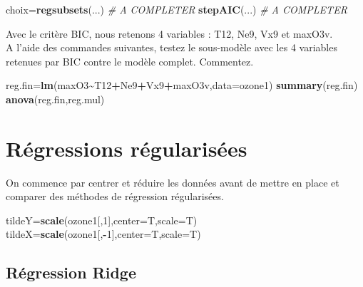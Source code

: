 \documentclass[
]{article}
\newenvironment{Shaded}{\begin{snugshade}}{\end{snugshade}}
\newcommand{\AttributeTok}[1]{\textcolor[rgb]{0.13,0.29,0.53}{#1}}
\newcommand{\CommentTok}[1]{\textcolor[rgb]{0.56,0.35,0.01}{\textit{#1}}}
\newcommand{\DecValTok}[1]{\textcolor[rgb]{0.00,0.00,0.81}{#1}}
\newcommand{\FunctionTok}[1]{\textcolor[rgb]{0.13,0.29,0.53}{\textbf{#1}}}
\newcommand{\NormalTok}[1]{#1}
\newcommand{\OtherTok}[1]{\textcolor[rgb]{0.56,0.35,0.01}{#1}}
\newcommand{\SpecialCharTok}[1]{\textcolor[rgb]{0.81,0.36,0.00}{\textbf{#1}}}
\begin{document}
\begin{Shaded}
\begin{Highlighting}[]
\NormalTok{choix}\OtherTok{=}\FunctionTok{regsubsets}\NormalTok{(...) }\CommentTok{\# A COMPLETER}
\FunctionTok{stepAIC}\NormalTok{(...)}
\CommentTok{\# A COMPLETER}
\end{Highlighting}
\end{Shaded}

Avec le critère BIC, nous retenons 4 variables : T12, Ne9, Vx9 et
maxO3v.\\
A l'aide des commandes suivantes, testez le sous-modèle avec les 4
variables retenues par BIC contre le modèle complet. Commentez.

\begin{Shaded}
\begin{Highlighting}[]
\NormalTok{reg.fin}\OtherTok{=}\FunctionTok{lm}\NormalTok{(maxO3}\SpecialCharTok{\textasciitilde{}}\NormalTok{T12}\SpecialCharTok{+}\NormalTok{Ne9}\SpecialCharTok{+}\NormalTok{Vx9}\SpecialCharTok{+}\NormalTok{maxO3v,}\AttributeTok{data=}\NormalTok{ozone1)}
\FunctionTok{summary}\NormalTok{(reg.fin)}
\FunctionTok{anova}\NormalTok{(reg.fin,reg.mul)}
\end{Highlighting}
\end{Shaded}

\hypertarget{ruxe9gressions-ruxe9gularisuxe9es}{%
\section{Régressions
régularisées}\label{ruxe9gressions-ruxe9gularisuxe9es}}

On commence par centrer et réduire les données avant de mettre en place
et comparer des méthodes de régression régularisées.

\begin{Shaded}
\begin{Highlighting}[]
\NormalTok{tildeY}\OtherTok{=}\FunctionTok{scale}\NormalTok{(ozone1[,}\DecValTok{1}\NormalTok{],}\AttributeTok{center=}\NormalTok{T,}\AttributeTok{scale=}\NormalTok{T)}
\NormalTok{tildeX}\OtherTok{=}\FunctionTok{scale}\NormalTok{(ozone1[,}\SpecialCharTok{{-}}\DecValTok{1}\NormalTok{],}\AttributeTok{center=}\NormalTok{T,}\AttributeTok{scale=}\NormalTok{T)}
\end{Highlighting}
\end{Shaded}

\hypertarget{ruxe9gression-ridge}{%
\subsection{Régression Ridge}\label{ruxe9gression-ridge}}
\end{document}
